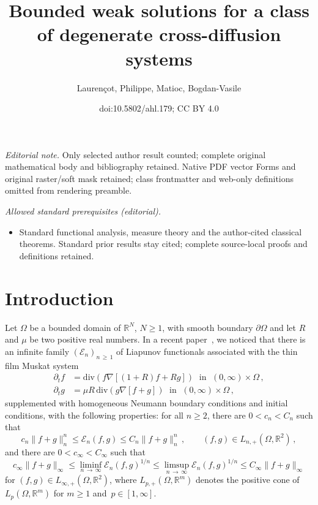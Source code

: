 \documentclass[10pt]{amsart}
\title{Bounded weak solutions for a class of degenerate cross-diffusion systems}
\author{Laurençot, Philippe, Matioc, Bogdan-Vasile}
\date{doi:10.5802/ahl.179; CC BY 4.0}
\theoremstyle{definition}\newtheorem{defi}[theo]{Definition}\newtheorem{rema}[theo]{Remark}\newtheorem{exam}[theo]{Example}\newtheorem{exem}[theo]{Example}\newtheorem{nota}[theo]{Notation}
\newcommand{\bbR}{\mathbb{R}}
\newcommand{\clE}{\mathcal{E}}
\newcommand{\divv}{\mathrm{div}}
\begin{document}
\maketitle
\noindent\textit{Editorial note.} Only selected author result counted; complete original mathematical body and bibliography retained. Native PDF vector Forms and original raster/soft mask retained; class frontmatter and web-only definitions omitted from rendering preamble.\par\medskip
\noindent\textit{Allowed standard prerequisites (editorial).}\begin{itemize}
\item Standard functional analysis, measure theory and the author-cited classical theorems. Standard prior results stay cited; complete source-local proofs and definitions retained.
\end{itemize}\medskip



\section{Introduction}\label{sec1}



Let $\Omega$ be a bounded domain of $\bbR^N$, $N\ge 1$, with smooth boundary $\partial\Omega$ and let $R$ and $\mu$ be two positive real numbers. In a recent paper~\cite{LM22}, we noticed that there is an infinite family $(\clE_n)_{n\,\ge\,1}$ of Liapunov functionals associated with the thin film Muskat system
\begin{align*}
\partial_t f & = \divv\left(f \nabla\left[(1+R)f + R g \right] \right) \;\text{ in }\; (0,\infty)\times \Omega\,, \\
\partial_t g & = \mu R\, \divv\left(g \nabla\left[f + g \right] \right) \;\text{ in }\; (0,\infty)\times \Omega\,,
\end{align*}
supplemented with homogeneous Neumann boundary conditions and initial conditions, with the following properties: for all $n\ge 2$, there are $0<c_n < C_n$ such that
\begin{equation*}
c_n \|f+g\|_n^n \le \clE_n(f,g) \le C_n \|f+g\|_n ^n\,, \qquad (f,g)\in L_{n,+}\left(\Omega,\bbR^2\right)\,,
\end{equation*}
and there are $0<c_\infty < C_\infty$ such that
\begin{equation*}
c_\infty \|f+g\|_\infty \le \liminf_{n\,\to\,\infty} \clE_n(f,g)^{1/n} \le \limsup_{n\,\to\,\infty} \clE_n(f,g)^{1/n} \le C_\infty \|f+g\|_\infty
\end{equation*}
for $(f,g)\in L_{\infty,+}(\Omega,\bbR^2)$, where $L_{p,+}(\Omega,\bbR^m)$ denotes the positive cone of $L_p(\Omega,\bbR^m)$ for $m\ge 1$ and~${p\in [1,\infty]}$.
\end{document}
